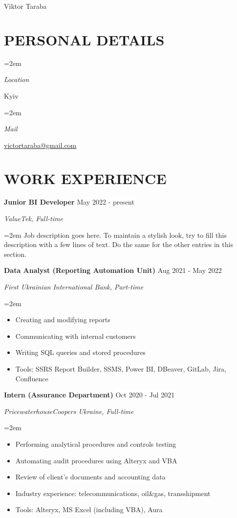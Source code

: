 \documentclass[paper=a4,fontsize=11pt]{scrartcl} %
\newlength{\spacebox}
\newcommand{\sepspace}{\vspace*{1em}}		%
\newcommand{\MyName}[1]{ %
		\Huge \usefont{OT1}{phv}{b}{n} \hfill #1
		\par \normalsize \normalfont}
\newcommand{\NewPart}[1]{\section*{\uppercase{#1}}}
\newcommand{\PersonalEntry}[2]{
		\noindent\hangindent=2em\hangafter=0 %
		\parbox{\spacebox}{        %
		\textit{#1}}		       %
		\hspace{1.5em} #2 \par}    %
\newcommand{\EducationEntry}[4]{
		\noindent \textbf{#1} \hfill      %
        \colorbox{White}{\color{Black}#2} \par  %
		\noindent \textit{#3} \par        %
		\noindent\hangindent=2em\hangafter=0 \small #4 %
		\normalsize \par}
\newcommand{\WorkEntry}[4]{				  %
		\noindent \textbf{#1} \hfill      %
		\colorbox{White}{\color{Black}#2} \par  %
		\noindent \textit{#3} \par              %
		\noindent\hangindent=2em\hangafter=0 \small #4 %
		\normalsize \par}
\begin{document}

\MyName{Viktor Taraba}

\sepspace

\NewPart{Personal details}{}

\PersonalEntry{Location}{Kyiv}
\PersonalEntry{Mail}{\url{victortaraba@gmail.com}}

\NewPart{Work experience}{}

\WorkEntry{Junior BI Developer}{May 2022 - present}{ValueTek, Full-time}{Job description goes here. To maintain a stylish look, try to fill this description with a few lines of text. Do the same for the other entries in this section.}
\sepspace

\WorkEntry{Data Analyst (Reporting Automation Unit)}{Aug 2021 - May 2022}{First Ukrainian International Bank, Part-time}{ \begin{itemize} \setlength{\itemsep}{0pt} \item Creating and modifying reports
\item Communicating with internal customers
\item Writing SQL queries and stored procedures \item[\textcolor{gray}{\textbullet}] Tools: SSRS Report Builder, SSMS, Power BI, DBeaver, GitLab, Jira, Confluence \end{itemize}}
\sepspace

\WorkEntry{Intern (Assurance Department)}{Oct 2020 - Jul 2021}{PricewaterhouseCoopers Ukraine, Full-time}{
\begin{itemize} \setlength{\itemsep}{0pt} \item Performing analytical procedures and controls testing \item Automating audit procedures using Alteryx and VBA \item Review of client's documents and accounting data 
\item Industry experience: telecommunications, oil&gas, transshipment \item[\textcolor{gray}{\textbullet}] Tools: Alteryx, MS Excel (including VBA), Aura \end{itemize}}
\end{document}
